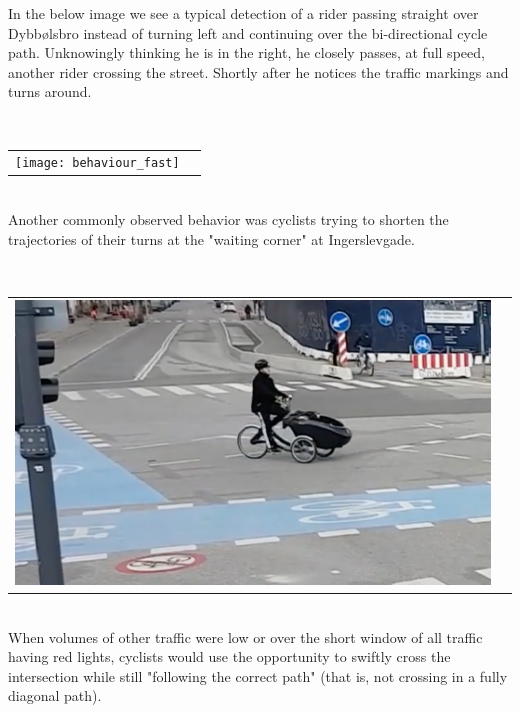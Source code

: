 In the below image we see a typical detection of a rider passing straight over Dybbølsbro instead of turning left and 
continuing over the bi-directional cycle path. Unknowingly thinking he is in the right, he closely passes, at full speed, another rider crossing
the street. Shortly after he notices the traffic markings and turns around. 

\ \\ 
\raggedbottom
\begin{tabular}{@{}cc}
\texttt{[image: behaviour\_fast]} 
\end{tabular}
\label{Alert}
\ \\

Another commonly observed behavior was cyclists trying to shorten the trajectories of their turns 
at the "waiting corner" at Ingerslevgade.

\raggedbottom
\ \\ 
\noindent
\begin{tabular}{@{}cc}
\includegraphics[width=1.0\columnwidth]{shorten_traj} 
\end{tabular}
\label{Alert}
\ \\

When volumes of other traffic were low or over the short window of all traffic having red lights, cyclists would use the opportunity 
to swiftly cross the intersection while still "following the correct path" (that is, not crossing in a fully diagonal path). 


